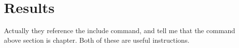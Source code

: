 \chapter{Results}
Actually they reference the include command, and tell me that the
command above section is chapter. Both of these are useful
instructions.
